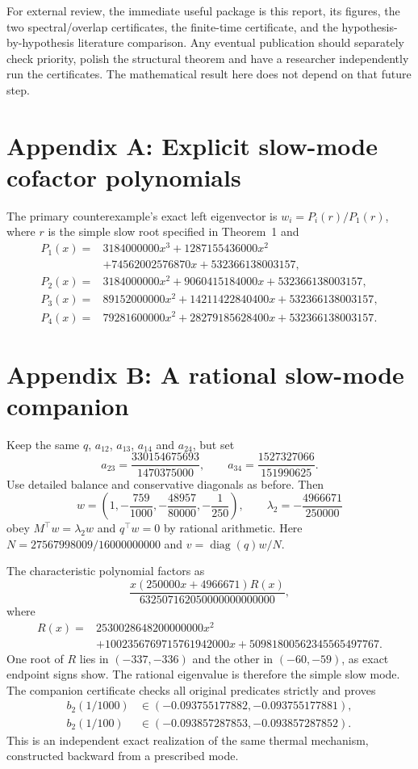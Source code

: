 \documentclass[11pt]{article}
\newcommand{\diag}{\operatorname{diag}}
\begin{document}
For external review, the immediate useful package is this report, its figures, the two spectral/overlap certificates, the finite-time certificate, and the hypothesis-by-hypothesis literature comparison. Any eventual publication should separately check priority, polish the structural theorem and have a researcher independently run the certificates. The mathematical result here does not depend on that future step.
\clearpage
\section*{Appendix A: Explicit slow-mode cofactor polynomials}\label{app:cofactors}
The primary counterexample's exact left eigenvector is $w_i=P_i(r)/P_1(r)$, where $r$ is the simple slow root specified in Theorem~1 and
\begin{align*}
P_1(x)={}&3184000000x^3+1287155436000x^2\\
&+74562002576870x+532366138003157,\\
P_2(x)={}&3184000000x^2+9060415184000x+532366138003157,\\
P_3(x)={}&89152000000x^2+14211422840400x+532366138003157,\\
P_4(x)={}&79281600000x^2+28279185628400x+532366138003157.
\end{align*}

\section*{Appendix B: A rational slow-mode companion}
Keep the same $q$, $a_{12}$, $a_{13}$, $a_{14}$ and $a_{24}$, but set
\[
a_{23}=\frac{330154675693}{1470375000},\qquad
 a_{34}=\frac{1527327066}{151990625}.
\]
Use detailed balance and conservative diagonals as before. Then
\[
w=\left(1,-\frac{759}{1000},-\frac{48957}{80000},-\frac1{250}\right),
\qquad \lambda_2=-\frac{4966671}{250000}
\]
obey $M^\top w=\lambda_2w$ and $q^\top w=0$ by rational arithmetic. Here $N=27567998009/16000000000$ and $v=\diag(q)w/N$.

The characteristic polynomial factors as
\[
\frac{x(250000x+4966671)R(x)}{632507162050000000000000},
\]
where
\begin{align*}
R(x)={}&2530028648200000000x^2\\
&+1002356769715761942000x+50981800562345565497767.
\end{align*}
One root of $R$ lies in $(-337,-336)$ and the other in $(-60,-59)$, as exact endpoint signs show. The rational eigenvalue is therefore the simple slow mode. The companion certificate checks all original predicates strictly and proves
\begin{align*}
b_2(1/1000)&\in(-0.093755177882,-0.093755177881),\\
b_2(1/100)&\in(-0.093857287853,-0.093857287852).
\end{align*}
This is an independent exact realization of the same thermal mechanism, constructed backward from a prescribed mode.
\end{document}
